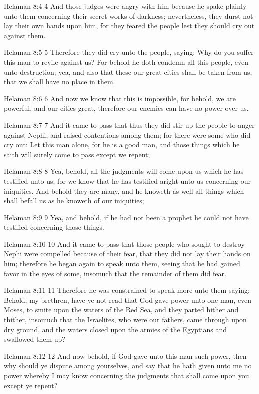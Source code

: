 Helaman 8:4
 4 And those judges were angry with him because he spake plainly
unto them concerning their secret works of darkness;
nevertheless, they durst not lay their own hands upon him, for
they feared the people lest they should cry out against them.

Helaman 8:5
 5 Therefore they did cry unto the people, saying: Why do you
suffer this man to revile against us? For behold he doth condemn
all this people, even unto destruction; yea, and also that these
our great cities shall be taken from us, that we shall have no
place in them.

Helaman 8:6
 6 And now we know that this is impossible, for behold, we are
powerful, and our cities great, therefore our enemies can have no
power over us.

Helaman 8:7
 7 And it came to pass that thus they did stir up the people to
anger against Nephi, and raised contentions among them; for there
were some who did cry out: Let this man alone, for he is a good
man, and those things which he saith will surely come to pass
except we repent;

Helaman 8:8
 8 Yea, behold, all the judgments will come upon us which he has
testified unto us; for we know that he has testified aright unto
us concerning our iniquities. And behold they are many, and he
knoweth as well all things which shall befall us as he knoweth of
our iniquities;

Helaman 8:9
 9 Yea, and behold, if he had not been a prophet he could not
have testified concerning those things.

Helaman 8:10
 10 And it came to pass that those people who sought to destroy
Nephi were compelled because of their fear, that they did not lay
their hands on him; therefore he began again to speak unto them,
seeing that he had gained favor in the eyes of some, insomuch
that the remainder of them did fear.

Helaman 8:11
 11 Therefore he was constrained to speak more unto them saying:
Behold, my brethren, have ye not read that God gave power unto
one man, even Moses, to smite upon the waters of the Red Sea, and
they parted hither and thither, insomuch that the Israelites, who
were our fathers, came through upon dry ground, and the waters
closed upon the armies of the Egyptians and swallowed them up?

Helaman 8:12
 12 And now behold, if God gave unto this man such power, then
why should ye dispute among yourselves, and say that he hath
given unto me no power whereby I may know concerning the
judgments that shall come upon you except ye repent?

